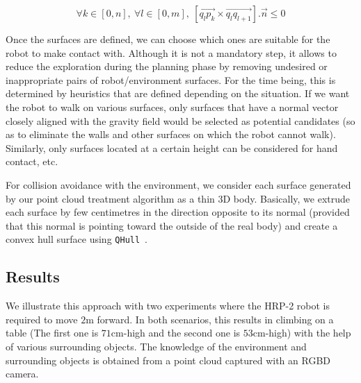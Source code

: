 \begin{equation}
\forall k \in [0, n],\ \forall l \in [0, m],\ \left[\overrightarrow{q_l p_k}\times\overrightarrow{q_l q_{l+1}}\right].\vec{n} \leq 0
\end{equation}


Once the surfaces are defined, we can choose which ones are suitable for the robot to make contact with.
Although it is not a mandatory step, it allows to reduce the exploration during the planning phase by removing undesired or inappropriate pairs of robot/environment surfaces.
For the time being, this is determined by heuristics that are defined depending on the situation.
If we want the robot to walk on various surfaces, only surfaces that have a normal vector closely aligned with the gravity field would be selected as potential candidates (so as to eliminate the walls and other surfaces on which the robot cannot walk).
Similarly, only surfaces located at a certain height can be considered for hand contact, etc.

For collision avoidance with the environment, we consider each surface generated by our point cloud treatment algorithm as a thin 3D body.
Basically, we extrude each surface by few centimetres in the direction opposite to its normal (provided that this normal is pointing toward the outside of the real body) and create a convex hull surface using {\tt QHull}~\cite{qhull:acm:1996}.

\subsection{Results}
\label{sub:results_pcl_plannif}

We illustrate this approach with two experiments where the HRP-2 robot is required to move $2$m forward.
In both scenarios, this results in climbing on a table (The first one is $71$cm-high and the second one is $53$cm-high) with the help of various surrounding objects.
The knowledge of the environment and surrounding objects is obtained from a point cloud captured with an RGBD camera.


